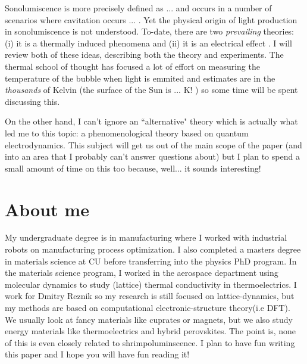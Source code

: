 \documentclass[prb,aps,12pt,superscriptaddress,floatfix]{revtex4-2}
\begin{document}
Sonolumiscence is more precisely defined as ... \cite{} and occurs in a number of scenarios where cavitation occurs ... \cite{}. Yet the physical origin of light production in sonolumiscence is not understood. To-date, there are two \emph{prevailing} theories: (i) it is a thermally induced phenomena \cite{} and (ii) it is an electrical effect \cite{}. I will review both of these ideas, describing both the theory and experiments. The thermal school of thought has focused a lot of effort on measuring the temperature of the bubble when light is emmited and estimates are in the \emph{thousands} of Kelvin (the surface of the Sun is ... K! \cite{}) so some time will be spent discussing this.

On the other hand, I can't ignore an ``alternative" theory which is actually what led me to this topic: a phenomenological theory based on quantum electrodynamics. This subject will get us out of the main scope of the paper (and into an area that I probably can't answer questions about) but I plan to spend a small amount of time on this too because, well... it sounds interesting!

\section{About me}

My undergraduate degree is in manufacturing where I worked with industrial robots on manufacturing process optimization. I also completed a masters degree in materials science at CU before transferring into the physics PhD program. In the materials science program, I worked in the aerospace department using molecular dynamics to study (lattice) thermal conductivity in thermoelectrics. I work for Dmitry Reznik so my research is still focused on lattice-dynamics, but my methods are based on computational electronic-structure theory(i.e DFT). We usually look at fancy materials like cuprates or magnets, but we also study energy materials like thermoelectrics and hybrid perovskites. The point is, none of this is even closely related to shrimpoluminscence. I plan to have fun writing this paper and I hope you will have fun reading it! 





\end{document}
